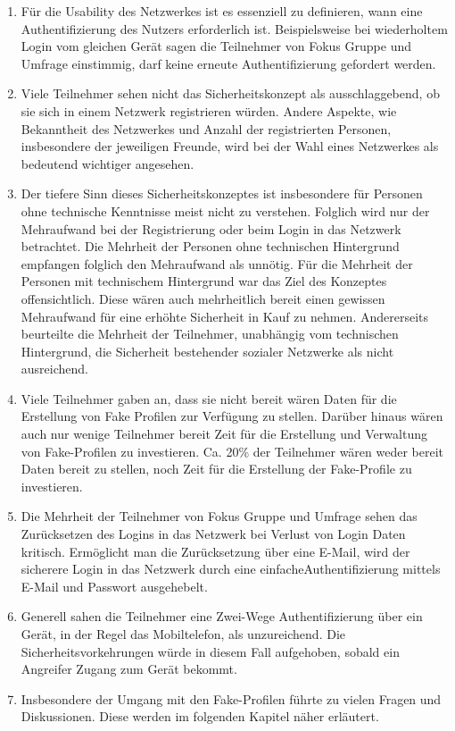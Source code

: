 \documentclass{sigchi}
\begin{document}
\begin{enumerate}
	\item Für die Usability des Netzwerkes ist es essenziell zu definieren, wann eine Authentifizierung des Nutzers erforderlich ist. Beispielsweise bei wiederholtem Login vom gleichen Gerät sagen die Teilnehmer von Fokus Gruppe und Umfrage einstimmig, darf keine erneute Authentifizierung gefordert werden. 
	\item Viele Teilnehmer sehen nicht das Sicherheitskonzept als ausschlaggebend, ob sie sich in einem Netzwerk registrieren würden. Andere Aspekte, wie Bekanntheit des Netzwerkes und Anzahl der registrierten Personen, insbesondere der jeweiligen Freunde, wird bei der Wahl eines Netzwerkes als bedeutend wichtiger angesehen.
	\item Der tiefere Sinn dieses Sicherheitskonzeptes ist insbesondere für Personen ohne technische Kenntnisse meist nicht zu verstehen. Folglich wird nur der Mehraufwand bei der Registrierung oder beim Login in das Netzwerk betrachtet. Die Mehrheit der Personen ohne technischen Hintergrund empfangen folglich den Mehraufwand als unnötig. Für die Mehrheit der Personen mit technischem Hintergrund war das Ziel des Konzeptes offensichtlich. Diese wären auch mehrheitlich bereit einen gewissen Mehraufwand für eine erhöhte Sicherheit in Kauf zu nehmen. Andererseits beurteilte die Mehrheit der Teilnehmer, unabhängig vom technischen Hintergrund, die Sicherheit bestehender sozialer Netzwerke als nicht ausreichend.
	\item Viele Teilnehmer gaben an, dass sie nicht bereit wären Daten für die Erstellung von Fake Profilen zur Verfügung zu stellen. Darüber hinaus wären auch nur wenige Teilnehmer bereit Zeit für die Erstellung und Verwaltung von Fake-Profilen zu investieren. Ca. 20\% der Teilnehmer wären weder bereit Daten bereit zu stellen, noch Zeit für die Erstellung der Fake-Profile zu investieren.
	\item Die Mehrheit der Teilnehmer von Fokus Gruppe und Umfrage sehen das Zurücksetzen des Logins in das Netzwerk bei Verlust von Login Daten kritisch. Ermöglicht man die Zurücksetzung über eine E-Mail, wird der sicherere Login in das Netzwerk durch eine \glqq einfache\grqq Authentifizierung mittels E-Mail und Passwort ausgehebelt.
	\item Generell sahen die Teilnehmer eine Zwei-Wege Authentifizierung über ein Gerät, in der Regel das Mobiltelefon, als unzureichend. Die Sicherheitsvorkehrungen würde in diesem Fall aufgehoben, sobald ein Angreifer Zugang zum Gerät bekommt.
	\item Insbesondere der Umgang mit den Fake-Profilen führte zu vielen Fragen und Diskussionen. Diese werden im folgenden Kapitel näher erläutert.
\end{enumerate}
\end{document}
